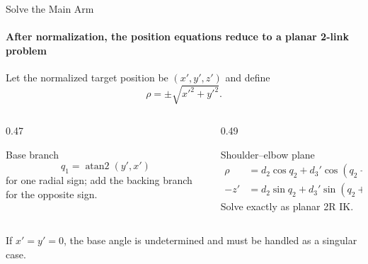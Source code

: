 \documentclass[aspectratio=169]{beamer}
\begin{document}
\begin{frame}[t]{Solve the Main Arm}
    \framesubtitle{After normalization, the position equations reduce to a planar 2-link problem}
    Let the normalized target position be $(x',y',z')$ and define
    \[
        \rho=\pm\sqrt{x'^2+y'^2}.
    \]
    \begin{columns}[T,onlytextwidth]
        \begin{column}{0.47\textwidth}
            \begin{block}{Base branch}
                \[
                    q_1=\operatorname{atan2}(y',x')
                \]
                for one radial sign; add the backing branch for the opposite sign.
            \end{block}
        \end{column}
        \begin{column}{0.49\textwidth}
            \begin{block}{Shoulder--elbow plane}
                \[
                    \begin{aligned}
                    \rho&=d_2\cos q_2+d_3'\cos(q_2+q_3+\Delta q),\\
                    -z'&=d_2\sin q_2+d_3'\sin(q_2+q_3+\Delta q).
                    \end{aligned}
                \]
                Solve exactly as planar 2R IK.
            \end{block}
        \end{column}
    \end{columns}
    If $x'=y'=0$, the base angle is undetermined and must be handled as a singular case.
\end{frame}
\end{document}
